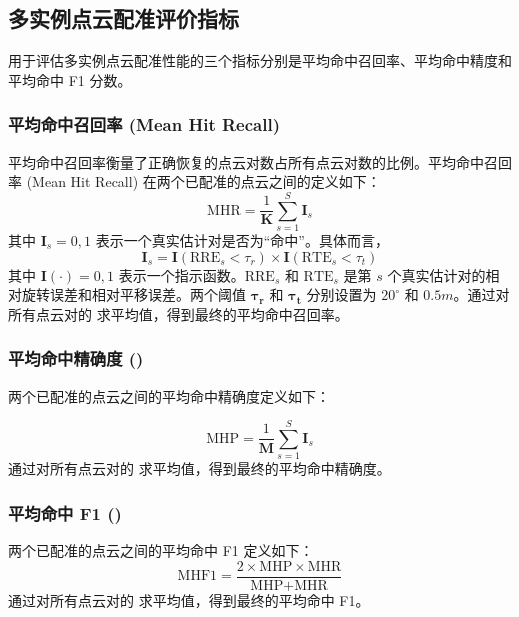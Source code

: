 \subsection{多实例点云配准评价指标}
\label{sec:multiinstance_eval}
用于评估多实例点云配准性能的三个指标分别是平均命中召回率、平均命中精度和平均命中 F1 分数。

\subsubsection{平均命中召回率 (Mean Hit Recall)}
平均命中召回率衡量了正确恢复的点云对数占所有点云对数的比例。平均命中召回率 (Mean Hit Recall) 在两个已配准的点云之间的定义如下：
\begin{equation}
    \text{MHR} = \frac{1}{\boldsymbol{K}} \sum_{s=1}^{S} \boldsymbol{I}_s
\end{equation}
其中 $\boldsymbol{I}_s = {0, 1}$ 表示一个真实估计对是否为“命中”。具体而言，
\begin{equation}
    \boldsymbol{I}_s = \boldsymbol{I}(\text{RRE}_s < \tau_r) \times \boldsymbol{I}(\text{RTE}_s < \tau_t)
\end{equation}
其中 $\boldsymbol{I}(\cdot) = {0, 1}$ 表示一个指示函数。$\text{RRE}_s$ 和 $\text{RTE}_s$ 是第 $s$ 个真实估计对的相对旋转误差和相对平移误差。两个阈值 $\boldsymbol{\tau_r}$ 和 $\boldsymbol{\tau_t}$ 分别设置为 $20^\circ$ 和 $0.5m$。通过对所有点云对的  求平均值，得到最终的平均命中召回率。

\subsubsection{平均命中精确度 ()}
两个已配准的点云之间的平均命中精确度定义如下：

\begin{equation}
\text{MHP} = \frac{1}{\boldsymbol{M}} \sum_{s=1}^{S} \boldsymbol{I}_s
\end{equation}
通过对所有点云对的  求平均值，得到最终的平均命中精确度。

\subsubsection{平均命中 F1 ()}
两个已配准的点云之间的平均命中 F1 定义如下：
\begin{equation}
\text{MHF1} = \frac{2 \times \text{MHP} \times \text{MHR}}{\text{MHP} + \text{MHR}}
\end{equation}
通过对所有点云对的  求平均值，得到最终的平均命中 F1。


